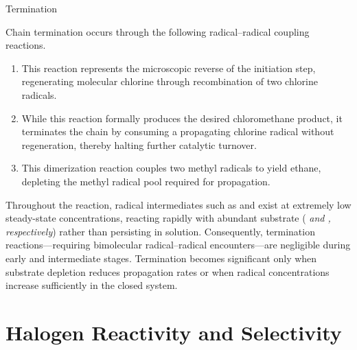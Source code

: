\documentclass[10pt]{article}
\begin{document}
  \begin{core}{Termination}

    Chain termination occurs through the following radical--radical coupling reactions.

    \begin{enumerate}

      \item {}
      
      This reaction represents the microscopic reverse of the initiation step, regenerating molecular chlorine through recombination of two chlorine radicals.

      \item {}
      
      While this reaction formally produces the desired chloromethane product, it terminates the chain by consuming a propagating chlorine radical without regeneration, thereby halting further catalytic turnover.

      \item {}
      
      This dimerization reaction couples two methyl radicals to yield ethane, depleting the methyl radical pool required for propagation.

    \end{enumerate}

    Throughout the reaction, radical intermediates such as  and  exist at extremely low steady-state concentrations, reacting rapidly with abundant substrate (\textit{ and , respectively}) rather than persisting in solution. Consequently, termination reactions---requiring bimolecular radical--radical encounters---are negligible during early and intermediate stages. Termination becomes significant only when substrate depletion reduces propagation rates or when radical concentrations increase sufficiently in the closed system.

  \end{core}

\section{Halogen Reactivity and Selectivity}
\end{document}
